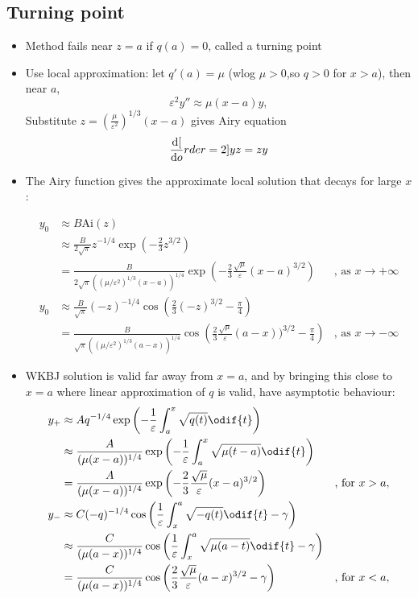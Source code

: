 \subsection*{Turning point}
\begin{itemize}
\item Method fails near $z=a$ if $q(a)=0$, called a turning point

\item Use local approximation: let $q'(a) = \mu$ (wlog $\mu > 0$,so $q>0$ for $x>a$), then near $a$, \[\varepsilon^2 y'' \approx \mu (x-a) y,\]
Substitute $z=\left(\frac{\mu}{\varepsilon^2}\right)^{1/3}(x-a)$ gives Airy equation
\[\frac{\mathrm{d}{[}}{\mathrm{d}{o}}rder=2]{y}{z} = zy\]

\item The Airy function gives the approximate local solution that decays for large $x$: 

\begin{align*}
    y_0 & \approx B\text{Ai}(z) \\
        & \approx \frac{B}{2\sqrt{\pi}}z^{-1/4}\exp\left({-\frac{2}{3}z^{3/2}}\right) \\
        & = \frac{B}{2\sqrt{\pi} \left(\left(\mu/\varepsilon^2\right)^{1/3}(x-a)\right)^{1/4}} \exp\left({-\frac{2}{3}\frac{\sqrt{\mu}}{\varepsilon}(x-a)^{3/2}}\right) 
        &\text{, as } x\to +\infty \\
    y_0 & \approx \frac{B}{\sqrt{\pi}} (-z)^{-1/4} \cos\left(\frac{2}{3}(-z)^{3/2} -\frac{\pi}{4}\right)  \\
        &= \frac{B}{ \sqrt{\pi} \left(\left(\mu/\varepsilon^2 \right)^{1/3} (a-x) \right)^{1/4}} 
        \cos\left(\frac{2}{3}\frac{\sqrt{\mu}}{\varepsilon}(a-x))^{3/2} -\frac{\pi}{4}\right)  
        &\text{, as } x\to -\infty   
\end{align*}

\item WKBJ solution is valid far away from $x=a$, and by bringing this close to $x=a$ where linear approximation of $q$ is valid, have asymptotic behaviour: 
\begin{align*}
    y_+ &\approx Aq^{-1/4} \exp\left(-\frac{1}{\varepsilon} \int_a^x \sqrt{q(t)} \odif{t} \right) \\
    &\approx \frac{A}{(\mu (x-a))^{1/4}} \exp\left(-\frac{1}{\varepsilon} \int_a^x \sqrt{\mu (t-a) } \odif{t} \right) \\
    &= \frac{A}{(\mu (x-a))^{1/4}} \exp\left(-\frac{2}{3}\frac{\sqrt{\mu}}{\varepsilon}(x-a)^{3/2} \right)
    &\text{, for } x>a, \\
    y_- &\approx C(-q)^{-1/4} \cos\left(\frac{1}{\varepsilon} \int_x^a \sqrt{-q(t)} \odif{t} - \gamma \right) \\
    &\approx \frac{C}{(\mu (a-x))^{1/4}} \cos\left(\frac{1}{\varepsilon} \int_x^a \sqrt{\mu (a-t) } \odif{t} -\gamma \right) \\
    &= \frac{C}{(\mu (a-x))^{1/4}} \cos\left(\frac{2}{3}\frac{\sqrt{\mu}}{\varepsilon}(a-x)^{3/2} -\gamma \right) 
    &\text{, for } x<a,
\end{align*}


\end{itemize}
